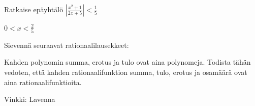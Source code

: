 \begin{tehtavasivu}

\begin{tehtava}
	Ratkaise epäyhtälö $|\frac{x^2+1}{2x+5}| < \frac15$
	\begin{vastaus}
		$0 < x < \frac25$
	\end{vastaus}
\end{tehtava}

\begin{tehtava}
Sievennä seuraavat rationaalilausekkeet:
\begin{alakohdat}
\end{alakohdat}

\begin{vastaus}
\begin{alakohdat}
\end{alakohdat}
\end{vastaus}
\end{tehtava}

\begin{tehtava}
Kahden polynomin summa, erotus ja tulo ovat aina polynomeja. Todista tähän vedoten, että kahden rationaalifunktion summa, tulo, erotus ja osamäärä ovat aina rationaalifunktioita.
\begin{vastaus}
Vinkki: Lavenna
\end{vastaus}
\end{tehtava}

\end{tehtavasivu}

